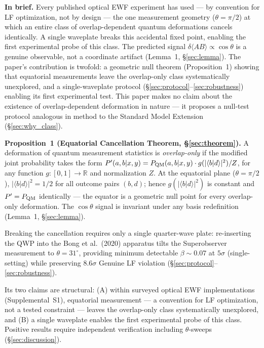 \documentclass[twocolumn,aps,pra,superscriptaddress,floatfix,10pt]{revtex4-2}
\begin{document}
\textbf{In brief.} Every published optical EWF experiment has used --- by convention
for LF optimization, not by design --- the one measurement geometry ($\theta = \pi/2$)
at which an entire class of overlap-dependent quantum deformations cancels
identically. A single waveplate breaks this accidental fixed point, enabling
the first experimental probe of this class. The predicted signal
$\delta\langle AB\rangle \propto \cos\theta$ is a genuine observable, not a coordinate artifact
(Lemma~1, \S\ref{sec:lemma}). The paper's contribution is twofold: a geometric null
theorem (Proposition~1) showing that equatorial measurements leave the
overlap-only class systematically unexplored, and a single-waveplate
protocol (\S\ref{sec:protocol}--\ref{sec:robustness}) enabling its first experimental test. This paper makes no
claim about the existence of overlap-dependent deformation in nature --- it
proposes a null-test protocol analogous in method to the Standard Model
Extension~\cite{Colladay1997} (\S\ref{sec:why_class}).

\textbf{Proposition~1 (Equatorial Cancellation Theorem, \S\ref{sec:theorem}).} A deformation
of quantum measurement statistics is \emph{overlap-only} if the modified joint
probability takes the form $P'(a,b|x,y) = P_{\rm QM}(a,b|x,y) \cdot g(|\langle b|d\rangle|^2) / Z$,
for any function $g: [0,1] \to \mathbb{R}$ and normalization $Z$. At the equatorial
plane ($\theta = \pi/2$), $|\langle b|d\rangle|^2 = 1/2$ for all outcome pairs $(b,d)$; hence
$g(|\langle b|d\rangle|^2)$ is constant and $P' = P_{\rm QM}$ identically --- the equator is a
geometric null point for every overlap-only deformation. The $\cos\theta$
signal is invariant under any basis redefinition (Lemma~1, \S\ref{sec:lemma}).

Breaking the cancellation requires only a single quarter-wave plate:
re-inserting the QWP into the Bong et al.\ (2020) apparatus tilts the
Superobserver measurement to $\theta = 31^\circ$, providing minimum detectable
$\beta \sim 0.07$ at $5\sigma$ (single-setting) while preserving $8.6\sigma$ Genuine LF
violation (\S\ref{sec:protocol}--\ref{sec:robustness}).

Its two claims are structural: (A) within surveyed optical EWF
implementations (Supplemental~S1), equatorial measurement --- a convention
for LF optimization, not a tested constraint --- leaves the overlap-only
class systematically unexplored, and (B) a single waveplate enables the
first experimental probe of this class. Positive results require
independent verification including $\theta$-sweeps (\S\ref{sec:discussion}).
\end{document}
